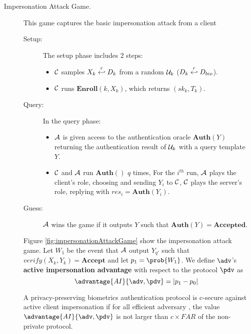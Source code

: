 \begin{description}
\begin{description}
  \item[Impersonation Attack Game.] This game captures the basic impersonation attack from a client
    \begin{description}
    \item[Setup:] The setup phase includes 2 steps:
      \begin{itemize}
      \item $\mathcal{C}$ samples $X_k \stackrel{r}{\hookleftarrow} D_{k}$ from a random
        $\mathcal{U}_k$ ($D_k \stackrel{r}{\hookleftarrow} D_{bio}$).
      \item $\mathcal{C}$ runs $\textbf{Enroll}(k, X_k)$, which returns $(sk_k, T_k)$.
      \end{itemize}
    \item[Query:] In the query phase:
      \begin{itemize}
      \item $\mathcal{A}$ is given access to the authentication oracle
        $\mathbf{Auth}(Y)$ returning the authentication result of $\mathcal{U}_k$ with
        a query template $Y$.

      \item $\mathcal{C}$ and $\mathcal{A}$ run $\mathbf{Auth()}$ $q$ times, For
        the $i^{th}$ run, $\mathcal{A}$ plays the client's role, choosing and
        sending $Y_i$ to $\mathcal{C}$, $\mathcal{C}$ plays the server's role,
        replying with $res_i = \mathbf{Auth}(Y_i)$.
      \end{itemize}
    \item[Guess:] $\mathcal{A}$ wins the game if it outputs $Y$ such that $\mathbf{Auth}(Y) = \textbf{Accepted}$.
    \end{description}
    Figure \ref{fig:impersonationAttackGame} show the impersonation attack
    game. Let $W_{1}$ be the event that $\mathcal{A}$ output $Y_{q'}$ such that
    $verify(X_{k},Y_{k}) = \mathbf{Accept}$ and let $p_{1} = \prob{W_{1}} $. We
    define $\adv$'s \textbf{active impersonation advantage} with respect to the
    protocol $\pdv$ as
    \[
      \advantage{AI}{\adv,\pdv} = |p_{1} - p_{0}|
    \]
    \begin{definition}
       A privacy-preserving biometrics
      authentication protocol \pdv is c-secure against active client
      impersonation if for all efficient adversary \adv, the value
      $\advantage{AI}{\adv,\pdv}$ is not larger than $c \times FAR$ of the
      non-private protocol.
    \end{definition}
      

\end{description}
\end{description}
